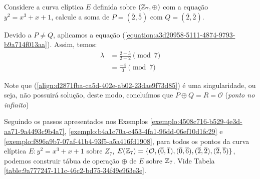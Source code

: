 \begin{exemplo} \label{exemplo:f896a9b7-07af-41b4-93f5-a5a416fd1908}

	Considere a curva elíptica $E$ definida sobre $(\mathbb{Z}_7, \oplus)$ com a equação
	$y^2 = x^3 + x + 1$, calcule a soma de $P = (\overline{2}, \overline{5})$ com
	$Q = (\overline{2}, \overline{2})$.

	Devido a $P \neq Q$, aplicamos a equação
	(\ref{equation:a3d20958-5111-4874-9793-b9a714f013aa}). Assim, temos:
	\begin{align}
		\lambda & = \frac{2 - 5}{2- 2} \pmod{7} \nonumber                                     \\
		        & = \frac{-4}{0} \pmod{7}  \label{align:d2871fba-ca5d-402e-ab02-23dae9f73d85}
	\end{align}

	\justify
	Note que (\ref{align:d2871fba-ca5d-402e-ab02-23dae9f73d85}) é uma singularidade, ou seja, não possuirá solução, deste modo, concluímos que $P \oplus Q = R =  \mathcal{O}$ (\textit{ponto no infinito})
\end{exemplo}

Seguindo os passos apresentados nos Exemplos
\ref{exemplo:4508c716-b529-4e3d-aa71-9a4493c9b4a7},
\ref{exemplo:b4a1c70a-c453-4fa1-96dd-06ef10d1fc29} e
\ref{exemplo:f896a9b7-07af-41b4-93f5-a5a416fd1908}, para todos os pontos da
curva elíptica $E: y^2 = x^3 + x + 1$ sobre $Z_{7}$, $E(\mathbb{Z}_{7}) =
	\{\mathcal{O}, (\overline{0}, \overline{1}), (\overline{0}, \overline{6}),
	(\overline{2}, \overline{2}), (\overline{2}, \overline{5}) \}$, podemos
construir tábua de operação $ \oplus$ de $E $ sobre $ \mathbb{Z}_{7} $. Vide Tabela
\ref{table:9a777247-111c-46c2-bd75-34f49e963e3e}.

